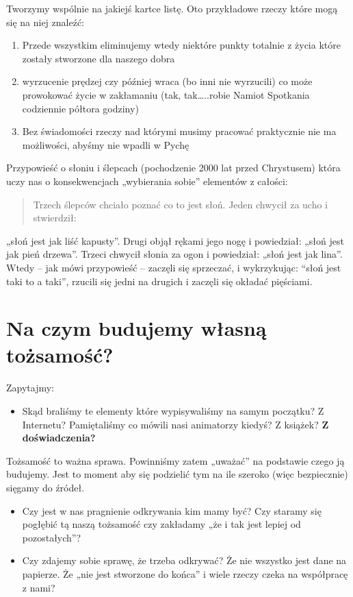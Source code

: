 \documentclass[a5paper,10pt,polish]{book}
\begin{document}
Tworzymy wspólnie na jakiejś kartce listę. Oto przykładowe rzeczy które mogą się na niej znaleźć:
\begin{enumerate}
\item {} 
Przede wszystkim eliminujemy wtedy niektóre punkty totalnie z życia które zostały stworzone dla naszego dobra

\item {} 
wyrzucenie prędzej czy później wraca (bo inni nie wyrzucili) co może prowokować życie w zakłamaniu (tak, tak…..robie Namiot Spotkania codziennie półtora godziny)

\item {} 
Bez świadomości rzeczy nad którymi musimy pracować praktycznie nie ma możliwości, abyśmy nie wpadli w Pychę

\end{enumerate}

Przypowieść o słoniu i ślepcach (pochodzenie 2000 lat przed Chrystusem) która uczy nas o konsekwencjach „wybierania sobie” elementów z całości:
\begin{quote}

Trzech ślepców chciało poznać co to jest słoń. Jeden chwycił za ucho i stwierdził:
\end{quote}

„słoń jest jak liść kapusty”. Drugi objął rękami jego nogę i powiedział: „słoń jest jak pień drzewa”. Trzeci chwycił słonia za ogon i powiedział: „słoń jest jak lina”. Wtedy
– jak mówi przypowieść – zaczęli się sprzeczać, i wykrzykując: “słoń jest taki to a taki”, rzucili się jedni na drugich i zaczęli się okładać pięściami.


\section{Na czym budujemy własną tożsamość?}
\label{babice2006-jesien-gliwice/spotkanie2:na-czym-budujemy-wlasna-tozsamosc}
Zapytajmy:
\begin{itemize}
\item {} 
Skąd braliśmy te elementy które wypisywaliśmy na samym początku? Z Internetu? Pamiętaliśmy co mówili nasi animatorzy kiedyś? Z książek? \textbf{Z doświadczenia?}

\end{itemize}

Tożsamość to ważna sprawa. Powinniśmy zatem „uważać” na podstawie czego ją budujemy. Jest to moment aby się podzielić tym na ile szeroko (więc bezpiecznie) sięgamy do źródeł.
\begin{itemize}
\item {} 
Czy jest w nas pragnienie odkrywania kim mamy być? Czy staramy się pogłębić tą naszą tożsamość czy zakładamy „że i tak jest lepiej od pozostałych”?

\item {} 
Czy zdajemy sobie sprawę, że trzeba odkrywać? Że nie wszystko jest dane na papierze. Że „nie jest stworzone do końca” i wiele rzeczy czeka na współpracę z nami?

\end{itemize}
\end{document}
